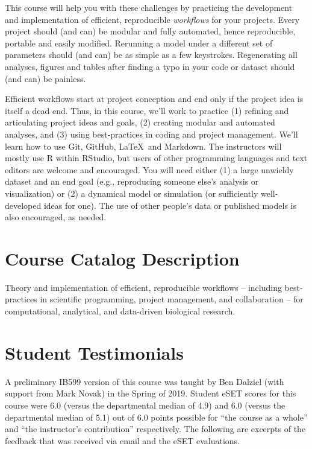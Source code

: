 \documentclass[10pt]{article}
\begin{document}
This course will help you with these challenges by practicing the development and implementation of efficient, reproducible \emph{workflows} for your projects.  Every project should (and can) be modular and fully automated, hence reproducible, portable and easily modified.  Rerunning a model under a different set of parameters should (and can) be as simple as a few keystrokes. Regenerating all analyses, figures and tables after finding a typo in your code or dataset should (and can) be painless.

Efficient workflows start at project conception and end only if the project idea is itself a dead end.  Thus, in this course, we'll work to practice (1) refining and articulating project ideas and goals, (2) creating modular and automated analyses, and (3) using best-practices in coding and project management. We'll learn how to use Git, GitHub, \LaTeX\, and Markdown.  The instructors will mostly use \textsf{R} within RStudio, but users of other programming languages and text editors are welcome and encouraged.  You will need either (1) a large unwieldy dataset and an end goal (e.g., reproducing someone else's analysis or visualization) or (2) a dynamical model or simulation (or sufficiently well-developed ideas for one).  The use of other people's data or published models is also encouraged, as needed.

\section*{Course Catalog Description}
Theory and implementation of efficient, reproducible workflows -- including best-practices in scientific programming, project management, and collaboration --  for computational, analytical, and data-driven biological research.

\section*{Student Testimonials}
A preliminary IB599 version of this course was taught by Ben Dalziel (with support from Mark Novak) in the Spring of 2019.  Student eSET scores for this course were 6.0 (versus the departmental median of 4.9) and 6.0 (versus the departmental median of 5.1) out of 6.0 points possible for ``the course as a whole'' and ``the instructor's contribution'' respectively. The following are excerpts of the feedback that was received via email and the eSET evaluations.
\end{document}
